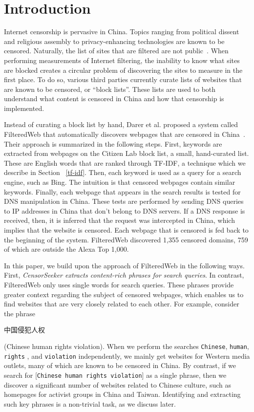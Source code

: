 
\section{Introduction} 

Internet censorship is pervasive in China. Topics ranging from political
dissent and religious assembly to privacy-enhancing technologies are known to
be censored. Naturally, the list of sites that are filtered are not
public~\cite{fhouse:china}. When performing measurements of Internet
filtering, the inability to know what sites are blocked creates a circular
problem of discovering the sites to measure in the first place. To do so, various
third parties currently curate
lists of websites that are known to be censored, or ``block lists''. These
lists are used to both understand {what} content is censored in China and
how that censorship is implemented.

Instead of curating a block list by hand, Darer et al. proposed a
system called FilteredWeb that automatically discovers webpages that
are censored in China~\cite{darer2017filteredweb}. Their approach is
summarized in the following steps. First, keywords are extracted from
webpages on the Citizen Lab block list, a small, hand-curated
list. These are English words that are ranked through TF-IDF, a
technique which we describe in Section ~\ref{tf-idf}. Then, each
keyword is used as a query for a search engine, such as Bing. The
intuition is that censored webpages contain similar keywords. Finally,
each webpage that appears in the search results is tested for DNS
manipulation in China. These tests are performed by sending DNS
queries to IP addresses in China that don't belong to DNS servers. If
a DNS response is received, then, it is inferred that the request was
intercepted in China, which implies that the website is censored. Each
webpage that is censored is fed back to the beginning of the
system. FilteredWeb discovered 1,355 censored domains, 759 of which
are outside the Alexa Top 1,000.

In this paper, we build upon the approach of FilteredWeb in the
following ways. First, {\em CensorSeeker extracts content-rich phrases
for search queries}. In contrast, FilteredWeb only uses single words
for search queries. These phrases provide greater context regarding
the subject of censored webpages, which enables us to find websites
that are very closely related to each other. For example, consider the
phrase \begin{CJK*}{UTF8}{gbsn}中国侵犯人权 \end{CJK*} (Chinese human
rights violation). When we perform the searches \texttt{Chinese},
\texttt{human}, \texttt{rights} , and \texttt{violation}
independently, we mainly get websites for Western media outlets, many
of which are known to be censored in China. By contrast, if we search
for [\texttt{Chinese human rights violation}] as a single phrase, then
we discover a significant number of websites related to Chinese
culture, such as homepages for activist groups in China and
Taiwan. Identifying and extracting such key phrases is a non-trivial
task, as we discuss later.

